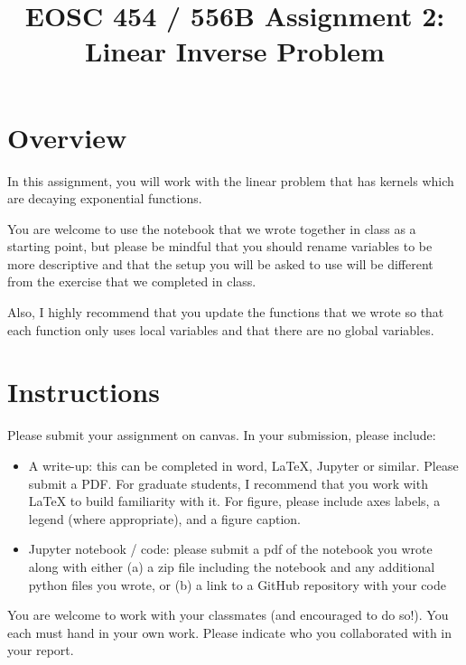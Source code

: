 \documentclass[twoside]{EOSC454} %
\title{EOSC 454 / 556B Assignment 2: Linear Inverse Problem}
\begin{document}

\begin{framed}

\section*{Overview}

In this assignment, you will work with the linear problem that has kernels which are decaying exponential functions.

You are welcome to use the notebook that we wrote together in class as a starting point, but please be mindful that you should rename variables to be more descriptive and that the setup you will be asked to use will be different from the exercise that we completed in class.

Also, I highly recommend that you update the functions that we wrote so that each function only uses local variables and that there are no global variables.




\section*{Instructions}
\sloppy

Please submit your assignment on canvas. In your submission, please include:
\begin{itemize}
    \item A write-up: this can be completed in word, LaTeX, Jupyter or similar. Please submit a PDF. For graduate students, I recommend that you work with LaTeX to build familiarity with it. For figure, please include axes labels, a legend (where appropriate), and a figure caption.

    \item Jupyter notebook / code: please submit a pdf of the notebook you wrote along with either (a) a zip file including the notebook and any additional python files you wrote, or (b) a link to a GitHub repository with your code
\end{itemize}

You are welcome to work with your classmates (and encouraged to do so!). You each must hand in your own work. Please indicate who you collaborated with in your report.


\end{framed}
\end{document}
